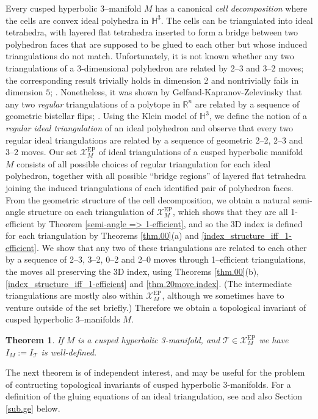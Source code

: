 \documentclass[12pt]{amsart}
\newtheorem{thm}{Theorem}[section]
\theoremstyle{definition}
\theoremstyle{remark}
\def\BR{\mathbb R}
\def\BH{\mathbb H}
\def\calX{\mathcal X}
\def\lbl{\label}
\newcommand{\CT}{\mathcal{T}}
\def\EP{\mathrm{EP}}
\begin{document}
Every cusped hyperbolic 3--manifold $M$ has
a canonical {\em cell decomposition} \cite{EP} where the cells are convex
ideal polyhedra in $\BH^3$. The cells can be triangulated into ideal 
tetrahedra, with layered flat tetrahedra inserted to form a bridge between two polyhedron faces that are supposed to be glued to each other but whose induced triangulations do not match. Unfortunately, it is not known whether any two triangulations
of a 3-dimensional polyhedron are related by 2--3 and 3--2 moves; the corresponding
result trivially holds in dimension 2 and nontrivially fails in dimension
$5$; \cite{DeLoera:book,Santos:ICM}. Nonetheless, it was shown by
Gelfand-Kapranov-Zelevinsky that any two {\em regular} triangulations 
of a polytope in $\BR^n$ are related by a sequence of geometric bistellar 
flips; \cite{GKZ}. Using the Klein model of $\BH^3$, we define the notion
of a \emph{regular ideal triangulation} of an ideal polyhedron and observe that
every two regular ideal triangulations are related by a sequence of geometric
2--2, 2--3 and 3--2 moves. Our set $\calX_M^{\EP}$ of ideal triangulations of a cusped hyperbolic manifold $M$ consists of all possible choices of regular triangulation for each ideal polyhedron, together with all possible ``bridge regions'' of layered flat tetrahedra joining the induced triangulations of each identified pair of polyhedron faces.
From the geometric structure of the cell decomposition, we obtain a natural semi-angle structure on each triangulation of $\calX_M^{\EP}$, which shows that they are all 1-efficient by Theorem \ref{semi-angle => 1-efficient}, and so the 3D index is defined for each triangulation by Theorems \ref{thm.00}(a) and  \ref{index_structure_iff_1-efficient}.  We show that any two of these triangulations are related to each other by a sequence of 2--3, 3--2, 0--2 and 2--0 moves through 1--efficient triangulations, the moves all preserving the 3D index, using Theorems \ref{thm.00}(b), \ref{index_structure_iff_1-efficient} and \ref{thm.20move.index}. (The intermediate triangulations are mostly also within $\calX_M^{\EP}$, although we sometimes have to venture outside of the set briefly.) Therefore we obtain a topological invariant of cusped hyperbolic 3--manifolds $M$.


\begin{thm}
\lbl{thm.2}
If $M$ is a cusped hyperbolic 3-manifold, and $\CT \in \calX_M^{\EP}$
we have $I_M:=I_{\CT}$ is well-defined. 
\end{thm}

The next theorem is of independent interest, and may be useful for the
problem of contructing topological invariants of cusped hyperbolic 3-manifolds.
For a definition of the gluing equations of an ideal triangulation, see \cite{NZ,Th} 
and also Section \ref{sub.ge} below.
\end{document}
